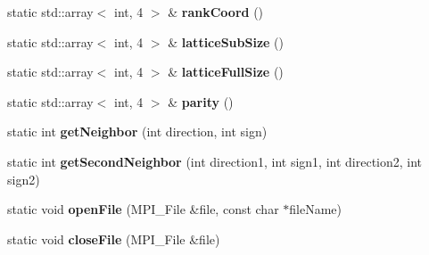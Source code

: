\begin{DoxyCompactItemize}
\item 
static std\+::array$<$ int, 4 $>$ \& {\bfseries rank\+Coord} ()\hypertarget{classParallel_a64dc2b62abe04ae4eeb2c55f9407b9dd}{}\label{classParallel_a64dc2b62abe04ae4eeb2c55f9407b9dd}

\item 
static std\+::array$<$ int, 4 $>$ \& {\bfseries lattice\+Sub\+Size} ()\hypertarget{classParallel_addeb93b221ca944c1916033f8ac5144e}{}\label{classParallel_addeb93b221ca944c1916033f8ac5144e}

\item 
static std\+::array$<$ int, 4 $>$ \& {\bfseries lattice\+Full\+Size} ()\hypertarget{classParallel_a5e2b7f890813ffc45221d92aee3e51bd}{}\label{classParallel_a5e2b7f890813ffc45221d92aee3e51bd}

\item 
static std\+::array$<$ int, 4 $>$ \& {\bfseries parity} ()\hypertarget{classParallel_ae4d683542868851b8d8229493c0fa412}{}\label{classParallel_ae4d683542868851b8d8229493c0fa412}

\item 
static int {\bfseries get\+Neighbor} (int direction, int sign)\hypertarget{classParallel_a4e99d3605b17fb51fa8a566cf0730179}{}\label{classParallel_a4e99d3605b17fb51fa8a566cf0730179}

\item 
static int {\bfseries get\+Second\+Neighbor} (int direction1, int sign1, int direction2, int sign2)\hypertarget{classParallel_afaecf8622c16bb5def671d881821db7d}{}\label{classParallel_afaecf8622c16bb5def671d881821db7d}

\item 
static void {\bfseries open\+File} (M\+P\+I\+\_\+\+File \&file, const char $\ast$file\+Name)\hypertarget{classParallel_afea26fc4854070b69224b42962b13091}{}\label{classParallel_afea26fc4854070b69224b42962b13091}

\item 
static void {\bfseries close\+File} (M\+P\+I\+\_\+\+File \&file)\hypertarget{classParallel_ad9ace91bf01fd00c19f7a20efc796285}{}\label{classParallel_ad9ace91bf01fd00c19f7a20efc796285}

\end{DoxyCompactItemize}
